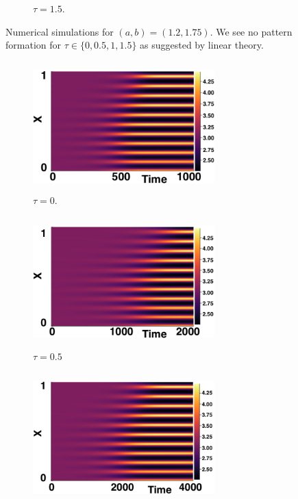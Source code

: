 \documentclass[12pt]{report}
\begin{document}
\begin{figure}[h]
\begin{subfigure}[b]{0.45\textwidth}
        \caption{$\tau=1.5$.}
        \label{}
    \end{subfigure}
    \caption{Numerical simulations for $(a,b)=(1.2,1.75)$. We see no pattern formation for $\tau\in\{0,0.5,1,1.5\}$ as suggested by linear theory.}
    \label{fig:testturing2}
\end{figure}

\begin{figure}[H]
    \centering
    \begin{subfigure}[b]{0.45\textwidth}
        \centering
        \includegraphics[width=7cm,height=5cm]{p2t0.png}
        \caption{$\tau=0$.}
        \label{}
    \end{subfigure}
    \hfill
    \begin{subfigure}[b]{0.45\textwidth}
        \centering
        \includegraphics[width=7cm,height=5cm]{p2t05.png}
        \caption{$\tau=0.5$}
        \label{}
    \end{subfigure}
    \hfill
    \begin{subfigure}[b]{0.45\textwidth}
        \centering
        \includegraphics[width=7cm,height=5cm]{p2t1.png}

\end{subfigure}
\end{figure}
\end{document}
